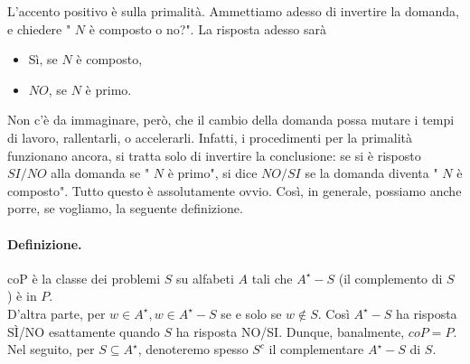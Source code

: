 L'accento positivo è sulla primalità. Ammettiamo adesso di invertire la domanda,
e chiedere " $N$ è composto o no?". La risposta adesso sarà

\begin{itemize}
    \item Sì, se $N$ è composto,
    \item $N O$, se $N$ è primo.
\end{itemize}

Non c'è da immaginare, però, che il cambio della domanda possa mutare i tempi
di lavoro, rallentarli, o accelerarli. Infatti, i procedimenti per la primalità
funzionano ancora, si tratta solo di invertire la conclusione: se si è
risposto $SI/NO$ alla domanda se " $N$ è primo", si
dice $NO/SI$ se la domanda diventa " $N$ è composto". Tutto questo
è assolutamente ovvio. Così, in generale, possiamo anche porre, se vogliamo,
la seguente definizione.

\paragraph{Definizione.} coP è la classe dei problemi $S$ su alfabeti $A$ tali
che $A^{\star}-S$ (il complemento di $S$ ) è in $P$.\\

D'altra parte, per $w \in A^{\star}, w \in A^{\star}-S$ se e solo se
$w \notin S$. Così $A^{\star}-S$ ha risposta SÌ/NO esattamente quando
$S$ ha risposta NO/SI. Dunque, banalmente, $c o P=P$.\\

Nel seguito, per $S \subseteq A^{\star}$, denoteremo spesso $S^c$ il
complementare $A^{\star}-S$ di $S$.